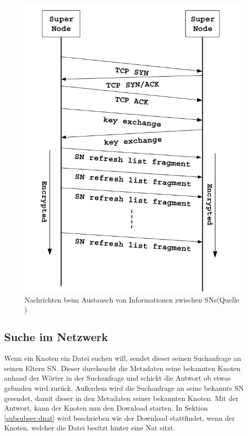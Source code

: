 \begin{figure}
\includegraphics[scale=0.3]{gfx/SnToSn}
\caption{Nachrichten beim Austausch von Informationen zwischen SNs(Quelle \cite{liang2006fasttrack})}
\label{fig:snsn}
\end{figure}

\subsection{Suche im Netzwerk}
\label{subsec:search}

Wenn ein Knoten ein Datei suchen will, sendet dieser seinen Suchanfrage an seinen Eltern SN.
Dieser durchsucht die Metadaten seine bekannten Knoten anhand der Wörter in der Suchanfrage und schickt die Antwort ob etwas gefunden wird zurück.
Außerdem wird die Suchanfrage an seine bekannte SN gesendet, damit dieser in den Metadaten seiner bekannten Knoten.
Mit der Antwort, kann der Knoten nun den Download starten.
In Sektion \ref{subsubsec:dnat} wird beschrieben wie der Download stattfindet, wenn der Knoten, welcher die Datei besitzt hinter eine Nat sitzt.

